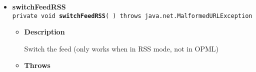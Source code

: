 {{{\begin{itemize}
{\begin{itemize}
{Switch the all feeds for the ones in new OPML file
}
\item{{\bf Throws}
}%
\end{itemize}
}%
 \item{ 
{\bf switchFeedRSS}\\
{\tt private void\ {\bf switchFeedRSS}(  ) throws java.net.MalformedURLException
\label{amber.crawler.RSS.switchFeedRSS()}}%
\begin{itemize}
\item{
{\bf Description}

Switch the feed (only works when in RSS mode, not in OPML)
}
\item{{\bf Throws}
}%
\end{itemize}
}%
\end{itemize}
}
}
}
